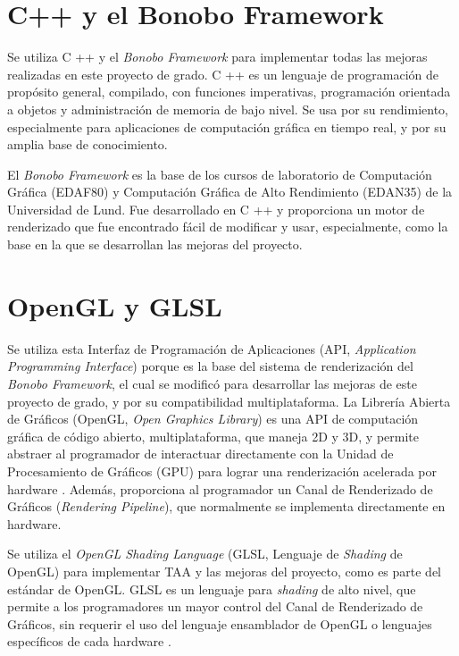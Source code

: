 \documentclass[pregrado]{tesis-usb} %
\begin{document}
\section{C++ y el Bonobo Framework}
Se utiliza C ++ y el \textit{Bonobo Framework} para implementar todas las mejoras realizadas en este proyecto de grado. C ++ es un lenguaje de programación de propósito general, compilado, con funciones imperativas, programación orientada a objetos y administración de memoria de bajo nivel. Se usa por su rendimiento, especialmente para aplicaciones de computación gráfica en tiempo real, y por su amplia base de conocimiento.

El \textit{Bonobo Framework} es la base de los cursos de laboratorio de Computación Gráfica (EDAF80) y Computación Gráfica de Alto Rendimiento (EDAN35) de la Universidad de Lund. Fue desarrollado en C ++ y proporciona un motor de renderizado que fue encontrado fácil de modificar y usar, especialmente, como la base en la que se desarrollan las mejoras del proyecto.


\section{OpenGL y GLSL}
Se utiliza esta Interfaz de Programación de Aplicaciones (API, \textit{Application Programming Interface}) porque es la base del sistema de renderización del \textit{Bonobo Framework}, el cual se modificó para desarrollar las mejoras de este proyecto de grado, y por su compatibilidad multiplataforma. La Librería Abierta de Gráficos (OpenGL, \textit{Open Graphics Library}) es una API de computación gráfica de código abierto, multiplataforma, que maneja 2D y 3D, y permite abstraer al programador de interactuar directamente con la Unidad de Procesamiento de Gráficos (GPU) para lograr una renderización acelerada por hardware \cite{Doggett2017EDAF80}. Además, proporciona al programador un Canal de Renderizado de Gráficos (\textit{Rendering Pipeline}), que normalmente se implementa directamente en hardware.

Se utiliza el \textit{OpenGL Shading Language} (GLSL, Lenguaje de \textit{Shading} de OpenGL) para implementar TAA y las mejoras del proyecto, como es parte del estándar de OpenGL. GLSL es un lenguaje para \textit{shading} de alto nivel, que permite a los programadores un mayor control del Canal de Renderizado de Gráficos, sin requerir el uso del lenguaje ensamblador de OpenGL o lenguajes específicos de cada hardware \cite{Doggett2017EDAF80}.
\end{document}
